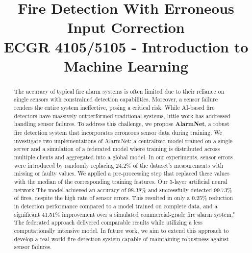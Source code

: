\documentclass[conference]{IEEEtran}
\begin{document}
\title{ Fire Detection With Erroneous Input Correction\\
        { \footnotesize ECGR 4105/5105 - Introduction to
            Machine Learning} }

\author{ 
\and
{}
\and
{}
 }
\maketitle

\begin{abstract}
The accuracy of typical fire alarm systems is often limited
due to their reliance on single sensors with constrained
detection capabilities. Moreover, a sensor failure renders
the entire system ineffective, posing a critical risk. While
AI-based fire detectors have massively outperformed
traditional systems, little work has addressed handling
sensor failures. To address this challenge, we propose
\textbf{AlarmNet}, a robust fire detection system that
incorporates erroneous sensor data during training.
We investigate two implementations of AlarmNet: a
centralized model trained on a single server and a
simulation of a federated model where training is
distributed across multiple clients and aggregated into a
global model. 
In our experiments, sensor errors were introduced
by randomly replacing 24.2\% of the dataset’s measurements
with missing or faulty values. We applied a pre-processing
step that replaced these values with the median of the
corresponding training features. Our 3-layer artificial
neural network The model achieved an accuracy of 98.38\% and
successfully detected 99.73\% of fires, despite the high
rate of sensor errors. This resulted in only a 0.25\%
reduction in detection performance compared to a model
trained on complete data, and a significant 41.51\%
improvement over a simulated commercial-grade fire alarm
system." The federated approach delivered comparable results
while utilizing a less computationally intensive model.
In future work, we aim to extend this approach to develop a
real-world fire detection system capable of maintaining
robustness against sensor failures.
\end{abstract}
\end{document}
